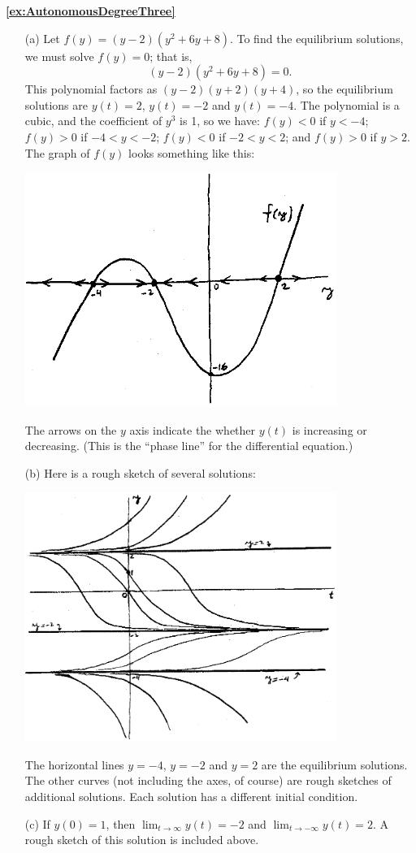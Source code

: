 \documentclass[reqno]{immbook}
\newcommand{\ds}{\displaystyle}
\numberwithin{equation}{chapter}
\numberwithin{question}{section}
\numberwithin{theorem}{chapter}
\numberwithin{figure}{chapter}
\theoremstyle{definition}
\begin{document}
\medskip
\textbf{\ref{ex:AutonomousDegreeThree}}
\begin{enumerate}
\item[(a)]
Let $f(y) = (y-2)(y^2+6y+8)$.
To find the equilibrium solutions, we must solve
$f(y)=0$; that is,
\[
   (y-2)(y^2+6y+8) = 0.
\]
This polynomial factors as $(y-2)(y+2)(y+4)$, so the
equilibrium solutions are $y(t)=2$, $y(t)=-2$ and $y(t)=-4$.
The polynomial is a cubic, and the coefficient of $y^3$ is 1,
so we have: $f(y) < 0$ if $y < -4$;
$f(y) > 0$ if $-4 < y < -2$;
$f(y) < 0$ if $-2 < y < 2$; and
$f(y) > 0$ if $y > 2$.
The graph of $f(y)$ looks something like this:

\centerline{\includegraphics[width=4in]{images/AutonomousDegreeThreePlota.eps}}

The arrows on the $y$ axis indicate the whether
$y(t)$ is increasing or decreasing.
(This is the ``phase line'' for the differential equation.)

\item[(b)]
Here is a rough sketch of several solutions:

\centerline{\includegraphics[width=4in]{images/AutonomousDegreeThreePlotb.eps}}

The horizontal lines $y=-4$, $y=-2$ and $y=2$ are the
equilibrium solutions.  The other curves
(not including the axes, of course) are rough sketches
of additional solutions.
Each solution has a different initial condition.
\item[(c)]
If $y(0)=1$, then $\ds \lim_{t\rightarrow\infty} y(t) = -2$
and $\ds \lim_{t\rightarrow -\infty} y(t) = 2$.
A rough sketch of this solution is included above.
\end{enumerate}
\end{document}

